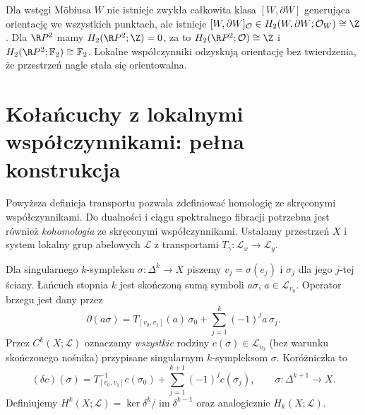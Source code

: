 \begin{przyklad}
Dla wstęgi Möbiusa $W$
nie istnieje zwykła
całkowita klasa
$[W,\partial W]$
generująca orientację
we wszystkich punktach,
ale istnieje
$[W,\partial W]_{\mathcal O}
\in H_2(W,\partial W;\mathcal O_W)
\cong\Z$.
Dla $\R P^2$ mamy
$H_2(\R P^2;\Z)=0$,
za to
$H_2(\R P^2;\mathcal O)\cong\Z$
i $H_2(\R P^2;\mathbb F_2)
\cong\mathbb F_2$.
Lokalne współczynniki
odzyskują orientację
bez twierdzenia,
że przestrzeń nagle
stała się orientowalna.
\end{przyklad}

\section{Kołańcuchy z lokalnymi współczynnikami: pełna konstrukcja}
\label{sec:lokalne-kolancuchy-v4}

Powyższa definicja transportu pozwala zdefiniować homologię
ze skręconymi współczynnikami. Do dualności i ciągu
spektralnego fibracji potrzebna jest również \emph{kohomologia}
ze skręconymi współczynnikami. Ustalamy przestrzeń $X$ i
system lokalny grup abelowych $\mathcal L$ z transportami
$T_\gamma:\mathcal L_x\to\mathcal L_y$.

\begin{definicja}
Dla singularnego $k$-sympleksu $\sigma:\Delta^k\to X$
piszemy $v_j=\sigma(e_j)$ i $\sigma_j$ dla jego $j$-tej
ściany. Łańcuch stopnia $k$ jest skończoną sumą symboli
$a\sigma$, $a\in\mathcal L_{v_0}$. Operator brzegu jest dany
przez
\[
\partial(a\sigma)=T_{[v_0,v_1]}(a)\,\sigma_0
+\sum_{j=1}^k(-1)^j a\,\sigma_j.
\]
Przez $C^k(X;\mathcal L)$ oznaczamy \emph{wszystkie} rodziny
$c(\sigma)\in\mathcal L_{v_0}$ (bez warunku skończonego nośnika)
przypisane singularnym $k$-sympleksom $\sigma$.
Koróżniczka to
\[
(\delta c)(\sigma)=T_{[v_0,v_1]}^{-1}c(\sigma_0)
+\sum_{j=1}^{k+1}(-1)^j c(\sigma_j),
\qquad\sigma:\Delta^{k+1}\to X.
\]
Definiujemy $H^k(X;\mathcal L)=\ker\delta^k/\operatorname{im}
\delta^{k-1}$ oraz analogicznie $H_k(X;\mathcal L)$.
\end{definicja}

